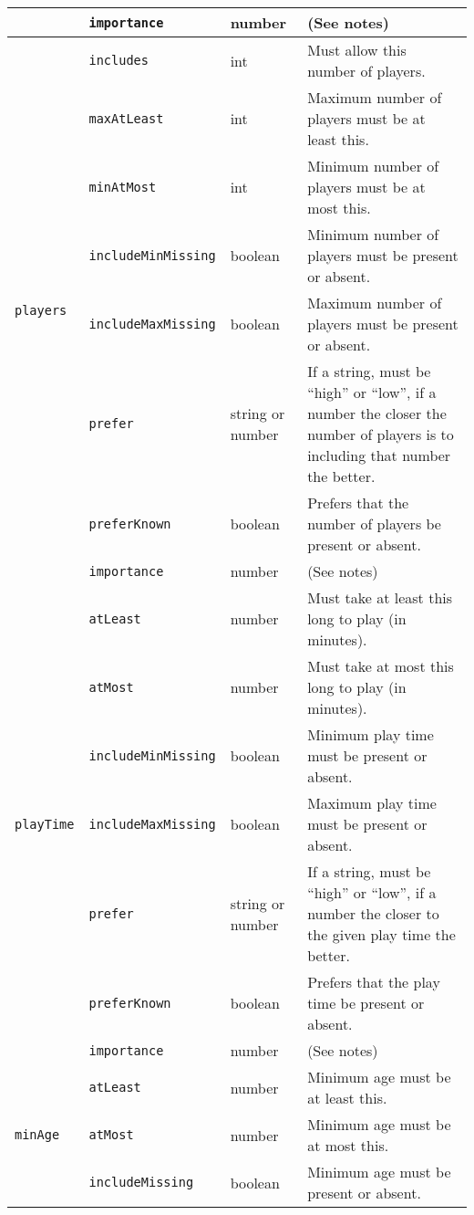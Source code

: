 \documentclass{article}
\newcommand{\code}[1]{\texttt{#1}}
\begin{document}
\begin{longtable}{|l|l|P{.1\textwidth}|P{.55\textwidth}|}
&\code{importance}&number&(See notes)\footnotemark[2]\\\hline
\multirow{8}{*}{\code{players}}&\code{includes}&int&Must allow this number of players.\\*
&\code{maxAtLeast}&int&Maximum number of players must be at least this.\\*
&\code{minAtMost}&int&Minimum number of players must be at most this.\\*
&\code{includeMinMissing}&boolean&Minimum number of players must be present or absent.\footnotemark[3]\\*
&\code{includeMaxMissing}&boolean&Maximum number of players must be present or absent.\footnotemark[3]\\*
&\code{prefer}&string or number&If a string, must be ``high'' or ``low'', if a number the closer the number of players is to including that number the better.\\*
&\code{preferKnown}&boolean&Prefers that the number of players be present or absent.\footnotemark[3]\\*
&\code{importance}&number&(See notes)\footnotemark[2]\\\hline
\multirow{7}{*}{\code{playTime}}&\code{atLeast}&number&Must take at least this long to play (in minutes).\\*
&\code{atMost}&number&Must take at most this long to play (in minutes).\\*
&\code{includeMinMissing}&boolean&Minimum play time must be present or absent.\footnotemark[3]\\*
&\code{includeMaxMissing}&boolean&Maximum play time must be present or absent.\footnotemark[3]\\*
&\code{prefer}&string or number&If a string, must be ``high'' or ``low'', if a number the closer to the given play time the better.\\*
&\code{preferKnown}&boolean&Prefers that the play time be present or absent.\footnotemark[3]\\*
&\code{importance}&number&(See notes)\footnotemark[2]\\\hline
\multirow{6}{*}{\code{minAge}}&\code{atLeast}&number&Minimum age must be at least this.\\*
&\code{atMost}&number&Minimum age must be at most this.\\*
&\code{includeMissing}&boolean&Minimum age must be present or absent.\footnotemark[3]\\*

\end{longtable}
\end{document}
